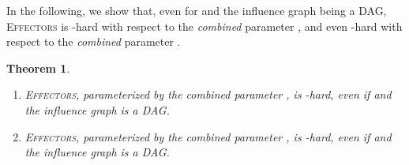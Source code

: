 \documentclass{article}
\newtheorem{theorem}{Theorem}
\newcommand{\probEffectors}{\textsc{Effectors}\xspace}
\begin{document}
In the following, we show that, even for  and the influence
graph being a DAG, \probEffectors is
-hard with respect to the \emph{combined} parameter ,
and even -hard with respect to the \emph{combined} parameter .

\begin{theorem}\label{thm:combinedHardness}
  \mbox{}
  \begin{enumerate}
    \item \probEffectors,
      parameterized by the combined parameter ,
      is -hard,
      even if 
      and the influence graph is a DAG.
    \item \probEffectors,
      parameterized by the combined parameter ,
      is -hard,
      even if 
      and the influence graph is a DAG.
  \end{enumerate}
\end{theorem}
\end{document}
